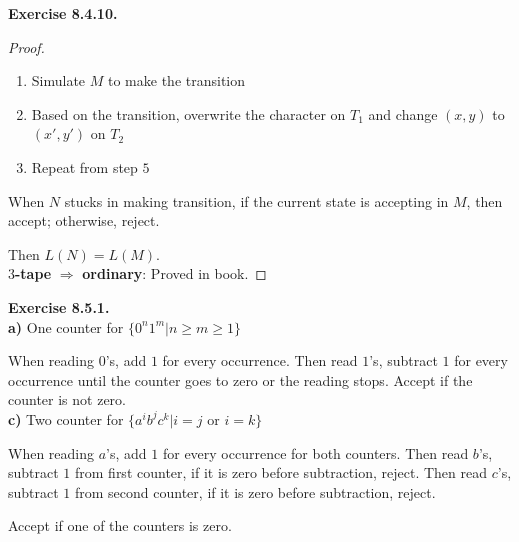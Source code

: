 \documentclass[a4paper]{article}
\newtheorem*{proof}{Proof}
\newenvironment{exercise}[1]{
	\par
	\noindent\textbf{Exercise #1.}\quad
}{
	\par
	\bigskip
}
\begin{document}
\begin{exercise}{8.4.10}
\begin{proof}
\begin{enumerate}
            \item Simulate $M$ to make the transition
            \item Based on the transition, overwrite the character on $T_1$ and change $(x,y)$ to $(x',y')$ on $T_2$
            \item Repeat from step $5$
        \end{enumerate}
        When $N$ stucks in making transition, if the current state is accepting in $M$, then accept;
        otherwise, reject.\par
        Then $L(N)=L(M)$.\\
    \textbf{$3$-tape} $\Rightarrow$ \textbf{ordinary}:
        Proved in book.
    \end{proof}
\end{exercise}

\begin{exercise}{8.5.1} \hspace{0pt}\\
\textbf{a)} One counter for $\{0^n1^m|n\geqslant m\geqslant 1\}$\par
    When reading $0$'s, add $1$ for every occurrence. Then read $1$'s, subtract $1$ for every occurrence until
    the counter goes to zero or the reading stops. Accept if the counter is not zero.\\
\textbf{c)} Two counter for $\{a^ib^jc^k|i=j\text{ or }i=k\}$\par
    When reading $a$'s, add $1$ for every occurrence for both counters. Then read $b$'s, subtract $1$ from first counter,
    if it is zero before subtraction, reject. Then read $c$'s, subtract $1$ from second counter,
    if it is zero before subtraction, reject.\par
    Accept if one of the counters is zero.
\end{exercise}
\end{document}
